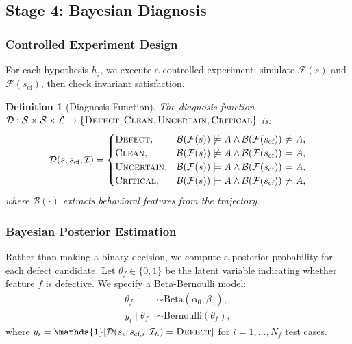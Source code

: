 \documentclass[journal]{IEEEtran}
\theoremstyle{plain}
\newtheorem{definition}{Definition}[section]
\theoremstyle{definition}
\theoremstyle{remark}
\newcommand{\invlib}{\mathcal{L}}
\newcommand{\scenario}{\mathcal{S}}
\newcommand{\sys}{\mathcal{F}}
\newcommand{\beh}{\mathcal{B}}
\newcommand{\diag}{\mathcal{D}}
\newcommand{\ind}{\mathds{1}}
\begin{document}
\subsection{Stage 4: Bayesian Diagnosis}
\label{sec:bayesian}

\subsubsection{Controlled Experiment Design}

For each hypothesis $h_j$, we execute a controlled experiment: simulate $\sys(s)$ and $\sys(s_{\text{cf}})$, then check invariant satisfaction.

\begin{definition}[Diagnosis Function]\label{def:diag}
The diagnosis function $\diag: \scenario \times \scenario \times \invlib \to \{\textsc{Defect}, \textsc{Clean}, \textsc{Uncertain}, \textsc{Critical}\}$ is:
\begin{equation}
\diag(s, s_{\text{cf}}, \mathcal{I}) =
\begin{cases}
\textsc{Defect}, & \beh(\sys(s)) \not\models A \land \beh(\sys(s_{\text{cf}})) \not\models A, \\
\textsc{Clean}, & \beh(\sys(s)) \not\models A \land \beh(\sys(s_{\text{cf}})) \models A, \\
\textsc{Uncertain}, & \beh(\sys(s)) \models A \land \beh(\sys(s_{\text{cf}})) \models A, \\
\textsc{Critical}, & \beh(\sys(s)) \models A \land \beh(\sys(s_{\text{cf}})) \not\models A,
\end{cases}
\label{eq:diag}
\end{equation}
where $\beh(\cdot)$ extracts behavioral features from the trajectory.
\end{definition}

\subsubsection{Bayesian Posterior Estimation}

Rather than making a binary decision, we compute a posterior probability for each defect candidate. Let $\theta_f \in \{0,1\}$ be the latent variable indicating whether feature $f$ is defective. We specify a Beta-Bernoulli model:
\begin{align}
\theta_f &\sim \text{Beta}(\alpha_0, \beta_0), \label{eq:prior} \\
y_i \mid \theta_f &\sim \text{Bernoulli}(\theta_f), \label{eq:likelihood}
\end{align}
where $y_i = \ind[\diag(s_i, s_{\text{cf},i}, \mathcal{I}_h) = \textsc{Defect}]$ for $i=1,\dots,N_f$ test cases.
\end{document}
